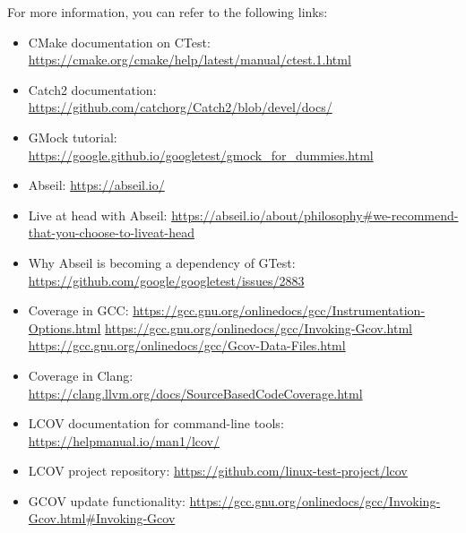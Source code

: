 For more information, you can refer to the following links:

\begin{itemize}
\item
CMake documentation on CTest:
\url{https://cmake.org/cmake/help/latest/manual/ctest.1.html}

\item
Catch2 documentation:
\url{https://github.com/catchorg/Catch2/blob/devel/docs/}

\item
GMock tutorial:
\url{https://google.github.io/googletest/gmock_for_dummies.html}

\item
Abseil:
\url{https://abseil.io/}

\item
Live at head with Abseil:
\url{https://abseil.io/about/philosophy#we-recommend-that-you-choose-to-liveat-head}

\item
Why Abseil is becoming a dependency of GTest:
\url{https://github.com/google/googletest/issues/2883}

\item
Coverage in GCC:
\url{https://gcc.gnu.org/onlinedocs/gcc/Instrumentation-Options.html}
\url{https://gcc.gnu.org/onlinedocs/gcc/Invoking-Gcov.html}
\url{https://gcc.gnu.org/onlinedocs/gcc/Gcov-Data-Files.html}

\item
Coverage in Clang:
\url{https://clang.llvm.org/docs/SourceBasedCodeCoverage.html}

\item
LCOV documentation for command-line tools:
\url{https://helpmanual.io/man1/lcov/}

\item
LCOV project repository:
\url{https://github.com/linux-test-project/lcov}

\item
GCOV update functionality:
\url{https://gcc.gnu.org/onlinedocs/gcc/Invoking-Gcov.html#Invoking-Gcov}
\end{itemize}













